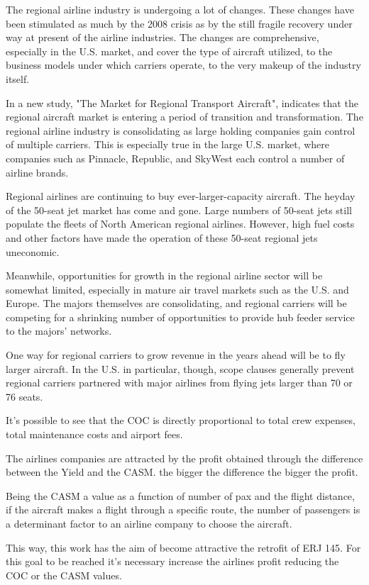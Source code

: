 The regional airline industry is undergoing a lot of changes. These changes have been stimulated as much by the 2008 crisis as by the still fragile recovery under way at present of the airline industries. The changes are comprehensive, especially in the U.S. market, and cover the type of aircraft utilized, to the business models under which carriers operate, to the very makeup of the industry itself.

In a new study, "The Market for Regional Transport Aircraft", indicates that the regional aircraft market is entering a period of transition and transformation. The regional airline industry is consolidating as large holding companies gain control of multiple carriers. This is especially true in the large U.S. market, where companies such as Pinnacle, Republic, and SkyWest each control a number of airline brands.

Regional airlines are continuing to buy ever-larger-capacity aircraft. The heyday of the 50-seat jet market has come and gone. Large numbers of 50-seat jets still populate the fleets of North American regional airlines. However, high fuel costs and other factors have made the operation of these 50-seat regional jets uneconomic.
	
Meanwhile, opportunities for growth in the regional airline sector will be somewhat limited, especially in mature air travel markets such as the U.S. and Europe. The majors themselves are consolidating, and regional carriers will be competing for a shrinking number of opportunities to provide hub feeder service to the majors' networks.

One way for regional carriers to grow revenue in the years ahead will be to fly larger aircraft. In the U.S. in particular, though, scope clauses generally prevent regional carriers partnered with major airlines from flying jets larger than 70 or 76 seats.

It's possible to see that the COC is directly proportional to total crew expenses, total maintenance costs and airport fees.
	
The airlines companies are attracted by the profit obtained through the difference between the Yield and the CASM. the bigger the difference the bigger the profit.

Being the CASM a value as a function of number of pax and the flight distance, if the aircraft makes a flight through a specific route, the number of passengers is a determinant factor to an airline company to choose the aircraft.

This way, this work has the aim of become attractive the retrofit of ERJ 145. For this goal to be reached it's necessary increase the airlines profit reducing the COC or the CASM values.

